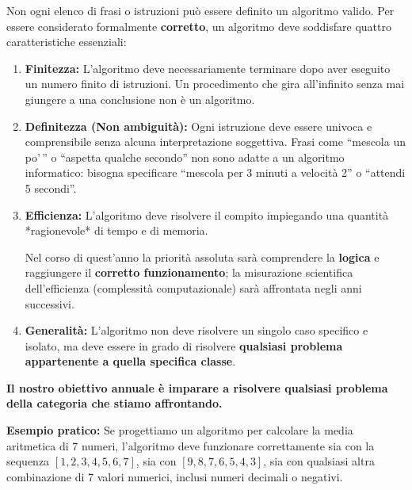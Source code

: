 Non ogni elenco di frasi o istruzioni può essere definito un algoritmo valido. Per essere considerato formalmente \textbf{corretto}, un algoritmo deve soddisfare quattro caratteristiche essenziali:

\begin{enumerate}
  \item \textbf{Finitezza:} L'algoritmo deve necessariamente terminare dopo aver eseguito un numero finito di istruzioni. Un procedimento che gira all'infinito senza mai giungere a una conclusione non è un algoritmo.
  
  \item \textbf{Definitezza (Non ambiguità):} Ogni istruzione deve essere univoca e comprensibile senza alcuna interpretazione soggettiva. Frasi come ``mescola un po'\,'' o ``aspetta qualche secondo'' non sono adatte a un algoritmo informatico: bisogna specificare ``mescola per 3 minuti a velocità 2'' o ``attendi 5 secondi''.
  
  \item \textbf{Efficienza:} L'algoritmo deve risolvere il compito impiegando una quantità *ragionevole* di tempo e di memoria. 
  \begin{consiglio}[Nota]
  Nel corso di quest'anno la priorità assoluta sarà comprendere la \textbf{logica} e raggiungere il \textbf{corretto funzionamento}; la misurazione scientifica dell'efficienza (complessità computazionale) sarà affrontata negli anni successivi.
  \end{consiglio}

  \item \textbf{Generalità:} L'algoritmo non deve risolvere un singolo caso specifico e isolato, ma deve essere in grado di risolvere \textbf{qualsiasi problema appartenente a quella specifica classe}.
\end{enumerate}

\begin{concetto}
\textbf{Il nostro obiettivo annuale è imparare a risolvere qualsiasi problema della categoria che stiamo affrontando.}

\vspace{0.5em}
\textbf{Esempio pratico:} Se progettiamo un algoritmo per calcolare la media aritmetica di 7 numeri, l'algoritmo deve funzionare correttamente sia con la sequenza $[1, 2, 3, 4, 5, 6, 7]$, sia con $[9, 8, 7, 6, 5, 4, 3]$, sia con qualsiasi altra combinazione di 7 valori numerici, inclusi numeri decimali o negativi.
\end{concetto}

